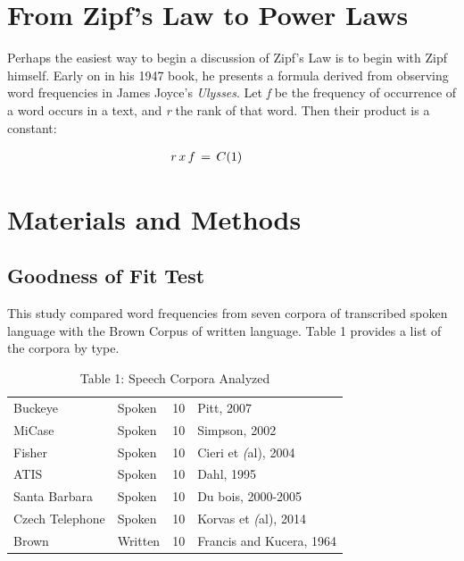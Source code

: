 \documentclass[12pt]{article}
\begin{document}
\section{From Zipf's Law to Power Laws}

\indent 
Perhaps the easiest way to begin a discussion of Zipf's Law is to begin with Zipf himself.  Early on in his 1947 book, he presents a formula derived from observing word frequencies in James Joyce's \emph{Ulysses}.  Let \emph{f} be the frequency of occurrence of a word occurs in a text, and \emph{r} the rank of that word.  Then their product is a constant:

\setlength{\abovedisplayskip}{1pt}
\setlength{\belowdisplayskip}{1pt}
\begin{center}
\begin{equation*}
\begin{aligned}
r\, x\, f\, =\, C\hspace{4em (1)}
\end{aligned}
\end{equation*}
\end{center}

\section{Materials and Methods}
\subsection{Goodness of Fit Test}

This study compared word frequencies from seven corpora of transcribed spoken language with the Brown Corpus of written language.  Table 1 provides a list of the corpora by type. 

\begin{table}[H]
\caption{Table 1: Speech Corpora Analyzed}
\begin{center}
\begin{tabular}{ |l|l|l|l| } 
 \hline
 Buckeye & Spoken & 10 & Pitt, 2007 \\ 
 MiCase & Spoken & 10 & Simpson, 2002 \\
 Fisher & Spoken & 10 & Cieri et \emph(al), 2004 \\ 
 ATIS   & Spoken & 10 & Dahl, 1995 \\
 Santa Barbara & Spoken & 10 & Du bois, 2000-2005 \\
 Czech Telephone & Spoken & 10 & Korvas et \emph(al), 2014 \\
 Brown & Written & 10 & Francis and Kucera, 1964 \\
 \hline
\end{tabular}
\end{center}
\end{table}
\end{document}
